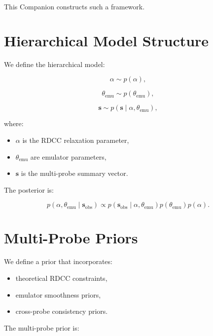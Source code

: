 \documentclass[11pt,a4paper]{article}
\begin{document}
This Companion constructs such a framework.
\section{Hierarchical Model Structure}

We define the hierarchical model:



\[
    \alpha \sim p(\alpha),
\]





\[
    \theta_{\mathrm{emu}} \sim p(\theta_{\mathrm{emu}}),
\]





\[
    \mathbf{s} \sim p(\mathbf{s} \mid \alpha, \theta_{\mathrm{emu}}),
\]



where:

\begin{itemize}
    \item $\alpha$ is the RDCC relaxation parameter,
    \item $\theta_{\mathrm{emu}}$ are emulator parameters,
    \item $\mathbf{s}$ is the multi-probe summary vector.
\end{itemize}

The posterior is:



\[
    p(\alpha, \theta_{\mathrm{emu}} \mid \mathbf{s}_{\mathrm{obs}})
    \propto
    p(\mathbf{s}_{\mathrm{obs}} \mid \alpha, \theta_{\mathrm{emu}})
    p(\theta_{\mathrm{emu}})
    p(\alpha).
\]


\section{Multi-Probe Priors}

We define a prior that incorporates:

\begin{itemize}
    \item theoretical RDCC constraints,
    \item emulator smoothness priors,
    \item cross-probe consistency priors.
\end{itemize}

The multi-probe prior is:
\end{document}
